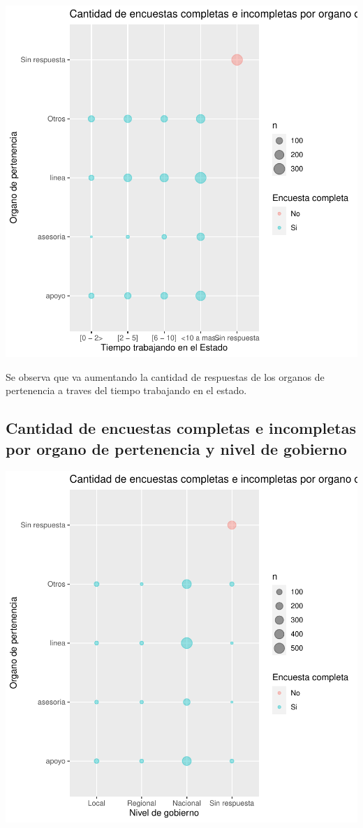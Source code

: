 \documentclass{article}
\begin{document}
\includegraphics{seguimientov3-030}

Se observa que va aumentando la cantidad de respuestas de los organos de pertenencia a traves del tiempo trabajando en el estado.

\subsection{Cantidad de encuestas completas e incompletas por organo de pertenencia y nivel de gobierno}

\includegraphics{seguimientov3-031}
\end{document}

